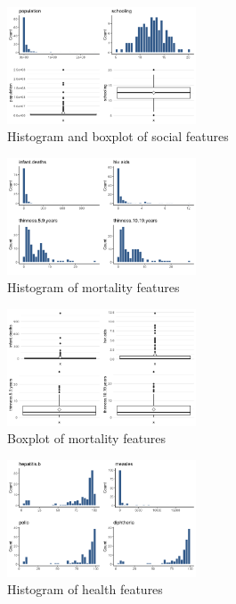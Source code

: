 
\begin{figure}[H]
	\centering
	\includegraphics[width=0.5\textwidth]{figures/eda/histogram_boxplot_social_features.png}
	\caption{Histogram and boxplot of social features}
	\label{fig:histogram_boxplot_social_features}
\end{figure}


\begin{figure}[H]
	\centering
	\includegraphics[width=0.5\textwidth]{figures/eda/histogram_mortality_features.png}
	\caption{Histogram of mortality features}
	\label{fig:histogram_mortality_features}
\end{figure}

\begin{figure}[H]
	\centering
	\includegraphics[width=0.5\textwidth]{figures/eda/boxplot_mortality_features.png}
	\caption{Boxplot of mortality features}
	\label{fig:boxplot_mortality_features}
\end{figure}


\begin{figure}[H]
	\centering
	\includegraphics[width=0.5\textwidth]{figures/eda/histogram_health_features.png}
	\caption{Histogram of health features}
	\label{fig:histogram_health_features}
\end{figure}

